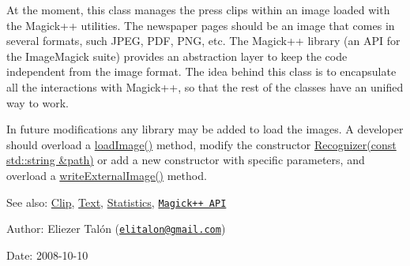 At the moment, this class manages the press clips within an image loaded with the Magick++ utilities. The newspaper pages should be an image that comes in several formats, such JPEG, PDF, PNG, etc. The Magick++ library (an API for the ImageMagick suite) provides an abstraction layer to keep the code independent from the image format. The idea behind this class is to encapsulate all the interactions with Magick++, so that the rest of the classes have an unified way to work.

In future modifications any library may be added to load the images. A developer should overload a \hyperlink{class_recognizer_acc4244738f2577a0c344c3b3af22eb0}{loadImage()} method, modify the constructor \hyperlink{class_recognizer_50ffc181208bb07ae651aba6249ee7e4}{Recognizer(const std::string \&path)} or add a new constructor with specific parameters, and overload a \hyperlink{class_recognizer_559f62a3e3e2d0b799bab38e975b4b67}{writeExternalImage()} method.

\begin{Desc}
\item[See also:]\hyperlink{class_clip}{Clip}, \hyperlink{class_text}{Text}, \hyperlink{class_statistics}{Statistics}, \href{http://www.imagemagick.org/Magick++/}{\tt Magick++ API}\end{Desc}
\begin{Desc}
\item[Author:]Eliezer Talón (\href{mailto:elitalon@gmail.com}{\tt elitalon@gmail.com}) \end{Desc}
\begin{Desc}
\item[Date:]2008-10-10 \end{Desc}


